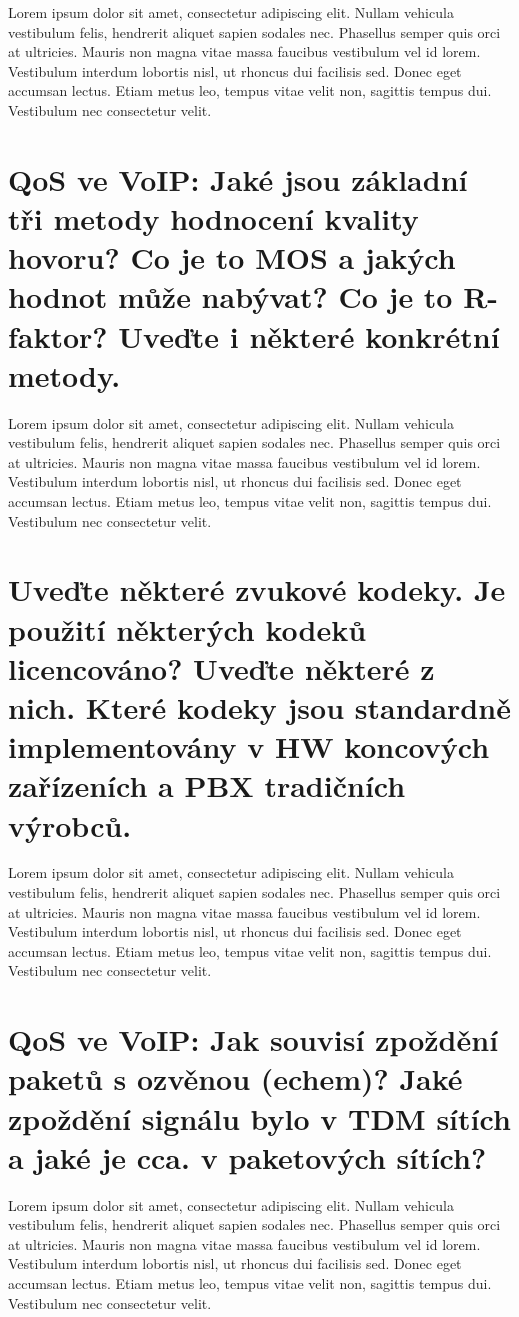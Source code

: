 Lorem ipsum dolor sit amet, consectetur adipiscing elit. Nullam vehicula vestibulum felis, hendrerit aliquet sapien sodales nec. Phasellus semper quis orci at ultricies. Mauris non magna vitae massa faucibus vestibulum vel id lorem. Vestibulum interdum lobortis nisl, ut rhoncus dui facilisis sed. Donec eget accumsan lectus. Etiam metus leo, tempus vitae velit non, sagittis tempus dui. Vestibulum nec consectetur velit.

\section{QoS ve VoIP: Jaké jsou základní tři metody hodnocení kvality hovoru? Co je to MOS a jakých hodnot může nabývat? Co je to R-faktor? Uveďte i některé konkrétní metody.}

Lorem ipsum dolor sit amet, consectetur adipiscing elit. Nullam vehicula vestibulum felis, hendrerit aliquet sapien sodales nec. Phasellus semper quis orci at ultricies. Mauris non magna vitae massa faucibus vestibulum vel id lorem. Vestibulum interdum lobortis nisl, ut rhoncus dui facilisis sed. Donec eget accumsan lectus. Etiam metus leo, tempus vitae velit non, sagittis tempus dui. Vestibulum nec consectetur velit.

\section{Uveďte některé zvukové kodeky. Je použití některých kodeků licencováno? Uveďte některé z nich. Které kodeky jsou standardně implementovány v HW koncových zařízeních a PBX tradičních výrobců.}

Lorem ipsum dolor sit amet, consectetur adipiscing elit. Nullam vehicula vestibulum felis, hendrerit aliquet sapien sodales nec. Phasellus semper quis orci at ultricies. Mauris non magna vitae massa faucibus vestibulum vel id lorem. Vestibulum interdum lobortis nisl, ut rhoncus dui facilisis sed. Donec eget accumsan lectus. Etiam metus leo, tempus vitae velit non, sagittis tempus dui. Vestibulum nec consectetur velit.

\section{QoS ve VoIP: Jak souvisí zpoždění paketů s ozvěnou (echem)? Jaké zpoždění signálu bylo v TDM sítích a jaké je cca. v paketových sítích?}

Lorem ipsum dolor sit amet, consectetur adipiscing elit. Nullam vehicula vestibulum felis, hendrerit aliquet sapien sodales nec. Phasellus semper quis orci at ultricies. Mauris non magna vitae massa faucibus vestibulum vel id lorem. Vestibulum interdum lobortis nisl, ut rhoncus dui facilisis sed. Donec eget accumsan lectus. Etiam metus leo, tempus vitae velit non, sagittis tempus dui. Vestibulum nec consectetur velit.

